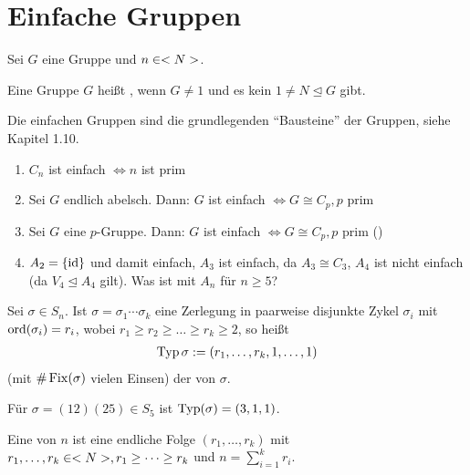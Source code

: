 \section{Einfache Gruppen}

Sei $G$ eine Gruppe und $n \in <N>$.

\begin{definition}
	Eine Gruppe $G$ heißt , wenn $G \neq 1$ und es kein $1 \neq N \unlhd G$ gibt. %
\end{definition}

\begin{remark}
	Die einfachen Gruppen sind die grundlegenden ``Bausteine'' der Gruppen, siehe Kapitel 1.10.
\end{remark}

\begin{example}
	\begin{enumerate}
		\item $C_n$ ist einfach $\Leftrightarrow n$ ist prim
		\item Sei $G$ endlich abelsch. Dann: $G$ ist einfach $\Leftrightarrow G \cong C_p, p$ prim
		\item Sei $G$ eine $p$-Gruppe. Dann: $G$ ist einfach $\Leftrightarrow G \cong C_p, p$ prim ()
		\item $A_2 = \{\operatorname{id}\}$ und damit einfach, $A_3$ ist einfach, da $A_3 \cong C_3$, $A_4$ ist nicht einfach (da $V_4 \unlhd A_4$ gilt). Was ist mit $A_n$ für $n \geq 5$?
	\end{enumerate}
\end{example}

\begin{definition}[Typ]
	Sei $\sigma \in S_n$. Ist $\sigma = \sigma_1\cdots \sigma_k$ eine Zerlegung in paarweise disjunkte Zykel $\sigma_i$ mit $\operatorname{ord}(\sigma_i)=r_i$, wobei $r_1 \geq r_2 \geq \dots \geq r_k \geq 2$, so heißt
	\begin{align}
	\operatorname{Typ}{\sigma} := (r_1,\dots,r_k,1,\dots,1)\notag
	\end{align}
	(mit $\#\operatorname{Fix}(\sigma)$ vielen Einsen) der  von $\sigma$.
\end{definition}

\begin{example}
	Für $\sigma = (12)(25) \in S_5$ ist $\operatorname{Typ}(\sigma) = (3,1,1)$.
\end{example}

\begin{definition}[Partition]
	Eine  von $n$ ist eine endliche Folge $(r_1,\dots,r_k)$ mit $r_1,\dots,r_k \in <N>,r_1\geq\dots\geq r_k$ und $n = \sum_{i=1}^{k} r_i$.
\end{definition}

